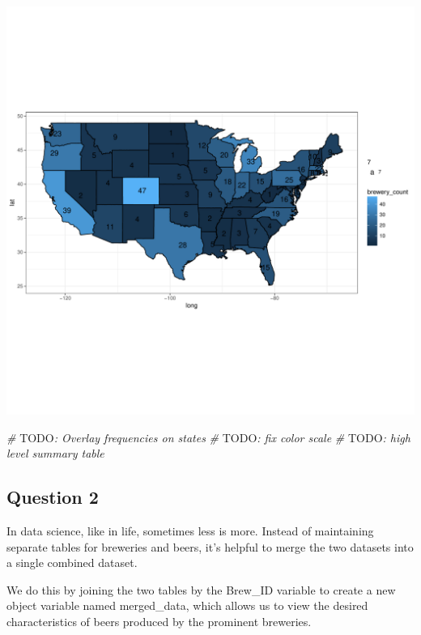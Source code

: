 \documentclass[]{article}
\newenvironment{Shaded}{\begin{snugshade}}{\end{snugshade}}
\newcommand{\CommentTok}[1]{\textcolor[rgb]{0.56,0.35,0.01}{\textit{#1}}}
\newcommand{\AlertTok}[1]{\textcolor[rgb]{0.94,0.16,0.16}{#1}}
\begin{document}
\begin{center}\includegraphics{Analysis_Final_files/figure-latex/unnamed-chunk-14-1} \end{center}

\begin{Shaded}
\begin{Highlighting}[]
\CommentTok{# }\AlertTok{TODO}\CommentTok{: Overlay frequencies on states}
\CommentTok{# }\AlertTok{TODO}\CommentTok{: fix color scale}
\CommentTok{# }\AlertTok{TODO}\CommentTok{: high level summary table}
\end{Highlighting}
\end{Shaded}

\subsection{Question 2}\label{question-2}

In data science, like in life, sometimes less is more. Instead of
maintaining separate tables for breweries and beers, it's helpful to
merge the two datasets into a single combined dataset.

We do this by joining the two tables by the Brew\_ID variable to create
a new object variable named merged\_data, which allows us to view the
desired characteristics of beers produced by the prominent breweries.
\end{document}
